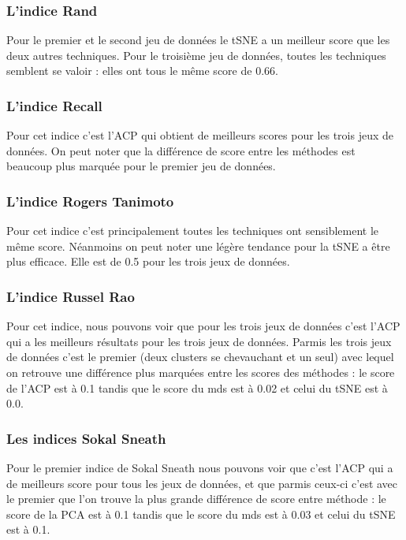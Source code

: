 \subsubsection{L'indice Rand}
Pour le premier et le second jeu de données le tSNE a un meilleur score que les deux autres techniques.
Pour le troisième jeu de données, toutes les techniques semblent se valoir : elles ont tous le même score de 0.66.


\subsubsection{L'indice Recall}
Pour cet indice c'est l'ACP qui obtient de meilleurs scores pour les trois jeux de données.
On peut noter que la différence de score entre les méthodes est beaucoup plus marquée pour le premier jeu de données.


\subsubsection{L'indice Rogers Tanimoto}
Pour cet indice c'est principalement toutes les techniques ont sensiblement le même score. Néanmoins on peut noter une légère tendance 
pour la tSNE a être plus efficace. Elle est de 0.5 pour les trois jeux de données.

\subsubsection{L'indice Russel Rao}
Pour cet indice, nous pouvons voir que pour les trois jeux de données c'est l'ACP qui a les meilleurs résultats pour les trois jeux de données.
Parmis les trois jeux de données c'est le premier (deux clusters se chevauchant et un seul) avec lequel on retrouve une différence plus marquées entre 
les scores des méthodes : le score de l'ACP est à 0.1 tandis que le score du mds est à 0.02 et celui du tSNE est à 0.0.

\subsubsection{Les indices Sokal Sneath}

Pour le premier indice de Sokal Sneath nous pouvons voir que c'est l'ACP qui a de meilleurs score pour tous les jeux de données, et que parmis ceux-ci
c'est avec le premier que l'on trouve la plus grande différence de score entre méthode : le score de la PCA est à 0.1 tandis que le score du mds est à 0.03 et celui du tSNE est à 0.1.

